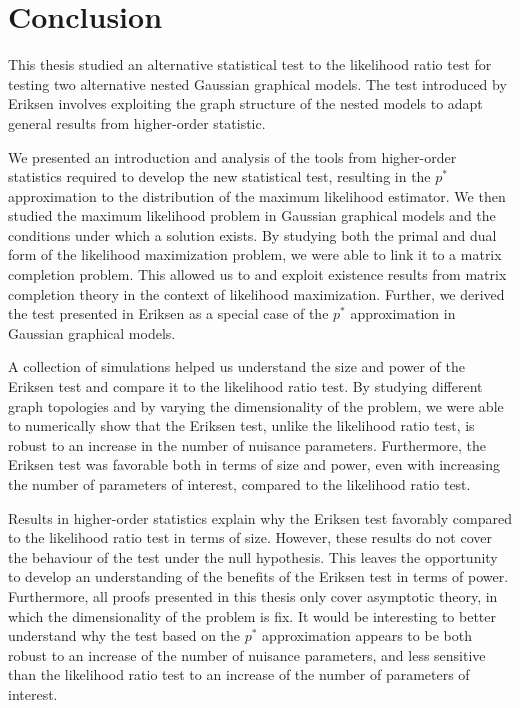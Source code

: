 \section{Conclusion}

This thesis studied an alternative statistical test to the likelihood ratio test for testing two alternative nested Gaussian graphical models. The test introduced by Eriksen \cite{eriksen1996tests} involves exploiting the graph structure of the nested models to adapt general results from higher-order statistic.

We presented an introduction and analysis of the tools from higher-order statistics required to develop the new statistical test, resulting in the $p^*$ approximation to the distribution of the maximum likelihood estimator. We then studied the maximum likelihood problem in Gaussian graphical models and the conditions under which a solution exists. By studying both the primal and dual form of the likelihood maximization problem, we were able to link it to a matrix completion problem. This allowed us to and exploit existence results from matrix completion theory in the context of likelihood maximization. Further, we derived the test presented in Eriksen \cite{eriksen1996tests} as a special case of the $p^*$ approximation in Gaussian graphical models.

A collection of simulations helped us understand the size and power of the Eriksen test and compare it to the likelihood ratio test. By studying different graph topologies and by varying the dimensionality of the problem, we were able to numerically show that the Eriksen test, unlike the likelihood ratio test, is robust to an increase in the number of nuisance parameters. Furthermore, the Eriksen test was favorable both in terms of size and power, even with increasing the number of parameters of interest, compared to the likelihood ratio test.

Results in higher-order statistics explain why the Eriksen test favorably compared to the likelihood ratio test in terms of size. However, these results do not cover the behaviour of the test under the null hypothesis. This leaves the opportunity to develop an understanding of the benefits of the Eriksen test in terms of power. Furthermore, all proofs presented in this thesis only cover asymptotic theory, in which the dimensionality of the problem is fix. It would be interesting to better understand why the test based on the $p^*$  approximation appears to be both robust to an increase of the number of nuisance parameters, and less sensitive than the likelihood ratio test to an increase of the number of parameters of interest. 